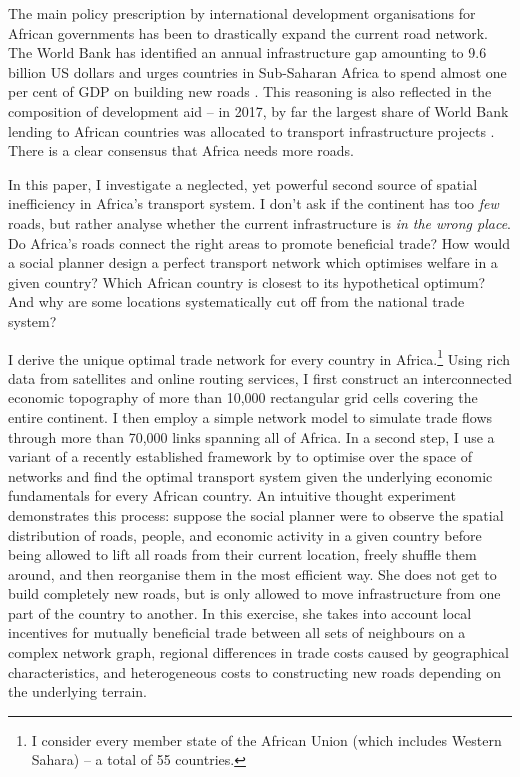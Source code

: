 \documentclass[11pt, oneside]{article}   	%
\begin{document}
The main policy prescription by international development organisations for African governments has been to drastically expand the current road network. The World Bank has identified an annual infrastructure gap amounting to 9.6 billion US dollars and urges countries in Sub-Saharan Africa to spend almost one per cent of GDP on building new roads \citep{Foster_AfricaInfrastructureTime_2010}. This reasoning is also reflected in the composition of development aid -- in 2017, by far the largest share of World Bank lending to African countries was allocated to transport infrastructure projects \citep{TheWorldBank_WorldBankAnnual_2017}. There is a clear consensus that Africa needs more roads.

In this paper, I investigate a neglected, yet powerful second source of spatial inefficiency in Africa's transport system. I don't ask if the continent has too \emph{few} roads, but rather analyse whether the current infrastructure is \emph{in the wrong place}. Do Africa's roads connect the right areas to promote beneficial trade? How would a social planner design a perfect transport network which optimises welfare in a given country? Which African country is closest to its hypothetical optimum? And why are some locations systematically cut off from the national trade system?

I derive the unique optimal trade network for every country in Africa.\footnote{I consider every member state of the African Union (which includes Western Sahara) -- a total of 55 countries.} Using rich data from satellites and online routing services, I first construct an interconnected economic topography of more than 10,000 rectangular grid cells covering the entire continent. I then employ a simple network model to simulate trade flows through more than 70,000 links spanning all of Africa. In a second step, I use a variant of a recently established framework by \cite{Fajgelbaum_OptimalTransportNetworks_2017} to optimise over the space of networks and find the optimal transport system given the underlying economic fundamentals for every African country. An intuitive thought experiment demonstrates this process: suppose the social planner were to observe the spatial distribution of roads, people, and economic activity in a given country before being allowed to lift all roads from their current location, freely shuffle them around, and then reorganise them in the most efficient way. She does not get to build completely new roads, but is only allowed to move infrastructure from one part of the country to another. In this exercise, she takes into account local incentives for mutually beneficial trade between all sets of neighbours on a complex network graph, regional differences in trade costs caused by geographical characteristics, and heterogeneous costs to constructing new roads depending on the underlying terrain.
\end{document}
